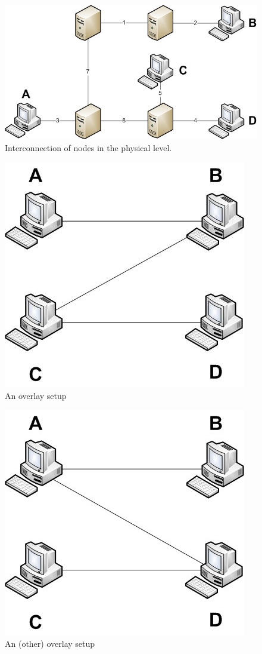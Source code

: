\documentclass[a4paper,10pt]{article}
\begin{document}
\begin{figure}
\centering
  \includegraphics[scale=0.4]{img/phys.jpeg}
\caption{Interconnection of nodes in the physical level.}
\label{figure:phys}
\end{figure}

\begin{figure}
\centering
  \includegraphics[scale=0.4]{img/over1.jpeg}
\caption{An overlay setup}
\label{figure:over1}
\end{figure}

\begin{figure}
\centering
  \includegraphics[scale=0.4]{img/over2.jpeg}
\caption{An (other) overlay setup}
\label{figure:over2}
\end{figure}
\end{document}
